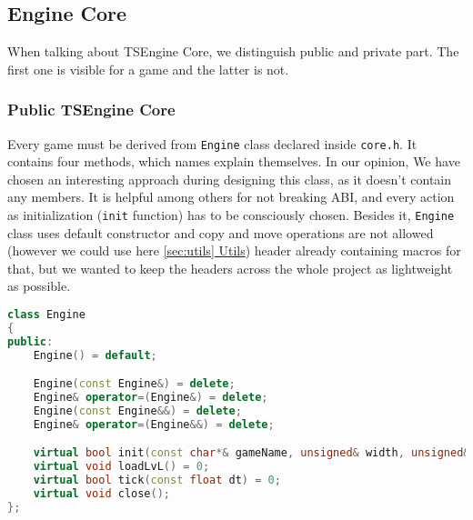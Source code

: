 \newpage
\subsection{Engine Core}
\label{sec:engine_core}
\hspace{\parindent} When talking about TSEngine Core, we distinguish public and private part. The first one is visible for a game and the latter is not.
\subsubsection{Public TSEngine Core}
\label{sec:public_engine}
\hspace{\parindent} Every game must be derived from \texttt{Engine} class declared inside \texttt{core.h}. It contains four methods, which names explain themselves. In our opinion, We have chosen an interesting approach during designing this class, as it doesn't contain any members. It is helpful among others for not breaking ABI, and every action as initialization (\texttt{init} function) has to be consciously chosen. Besides it, \texttt{Engine} class uses default constructor and copy and move operations are not allowed (however we could use here \hyperref[sec:utils]{\ref*{sec:utils} Utils}) header already containing macros for that, but we wanted to keep the headers across the whole project as lightweight as possible.\\
\label{lst:engine_class}
\begin{lstlisting}[language=c++, caption=Engine class (./engine/include/tsengine/core.h)]
class Engine
{
public:
    Engine() = default;

    Engine(const Engine&) = delete;
    Engine& operator=(Engine&) = delete;
    Engine(const Engine&&) = delete;
    Engine& operator=(Engine&&) = delete;

    virtual bool init(const char*& gameName, unsigned& width, unsigned& height);
    virtual void loadLvL() = 0;
    virtual bool tick(const float dt) = 0;
    virtual void close();
};
\end{lstlisting}

